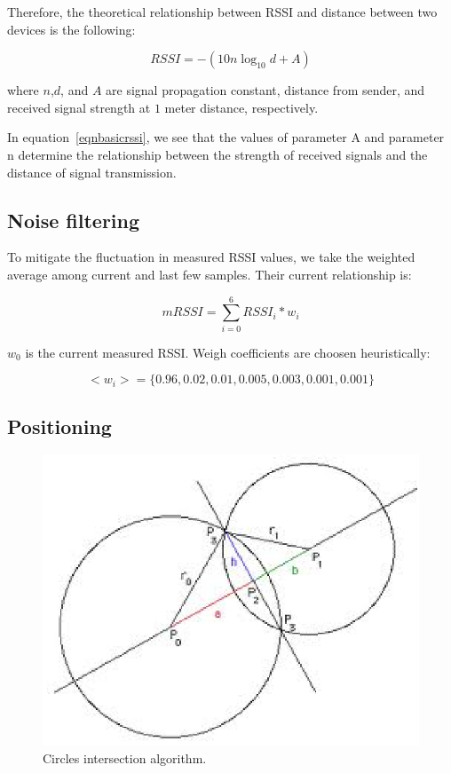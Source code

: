 \documentclass[conference,a4paper]{../../sty/IEEEtran}
\begin{document}
Therefore, the theoretical relationship between RSSI and distance between two devices is the following: \cite{chung2007enhanced}

\begin{equation}
  RSSI = -(10n \log_{10}d + A)
 \label{eqnbasicrssi}
\end{equation}

where $n$,$d$, and $A$ are signal propagation constant, distance from sender, and received signal strength at $1$ meter distance, respectively.

In equation~\ref{eqnbasicrssi}, we see that the values of parameter A and parameter n determine the relationship between the strength of received signals and the distance of signal transmission.

\subsection{Noise filtering}

To mitigate the fluctuation in measured RSSI values, we take the weighted average among current and last few samples.
Their current relationship is:

\begin{equation}
mRSSI = \sum_{i=0}^{6} RSSI_i * w_i
\end{equation}

$w_0$ is the current measured RSSI.
Weigh coefficients are choosen heuristically:

\begin{equation}
<w_i> = \{ 0.96, 0.02, 0.01, 0.005, 0.003, 0.001, 0.001 \}
\end{equation}

\subsection{Positioning}

\begin{figure}[h!]
\centering
\includegraphics[scale=0.7]{intr.eps}
\caption{Circles intersection algorithm.\cite{cshint}}
\label{fig2}
\end{figure}
\end{document}
